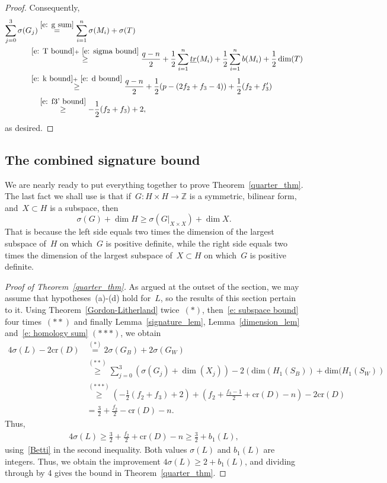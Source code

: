 \documentclass[10pt,a4paper]{amsart}
\numberwithin{equation}{section}
\newcommand{\rcr}{\mathrm{cr}}
\newcommand{\rdim}{\mathrm{dim}}
\newcommand{\bbZ}{\mathbb{Z}}
\begin{document}
\begin{proof}
Consequently,
\begin{align*}
\sum_{j=0}^3 \sigma(G_j) &\overset{\eqref{e: g sum}}{=} \sum_{i=1}^n \sigma(M_i) + \sigma(T) \\
&\mkern-20mu\overset{\eqref{e: T bound} +~\eqref{e: sigma bound}}{\ge} \frac{q-n}{2} +
\frac12 \sum_{i=1}^n \underline{tr}(M_i) + \frac12 \sum_{i=1}^n b(M_i) + \frac12 \dim(T) \\
&\mkern-20mu\overset{\eqref{e: k bound} +~\eqref{e: d bound}}{\ge} \frac{q-n}{2} +
\frac12 (p - (2f_2 + f_3 - 4))+ \frac12 (f_2+f_3') \\
&\overset{\eqref{e: f3' bound}}{\ge} - \frac12 (f_2 +f_3) +2,
\end{align*}
as desired.
\end{proof}

\subsection{The combined signature bound}

We are nearly ready to put everything together to prove Theorem~\ref{quarter_thm}. The last fact we shall use is that if~$G : H \times H \to \bbZ$ is a symmetric, bilinear form, and~$X \subset H$ is a subspace, then
\begin{equation}\label{e: subspace bound}
\sigma(G) + \dim H \ge \sigma(G |_{X \times X}) + \dim X.
\end{equation}
That is because the left side equals two times the dimension of the largest subspace of~$H$ on which~$G$ is positive definite, while the right side equals two times the dimension of the largest subspace of~$X \subset H$ on which~$G$ is positive definite.


\begin{proof}[Proof of Theorem~\ref{quarter_thm}]
As argued at the outset of the section, we may assume that hypotheses~(a)-(d) hold for~$L$, so the results of this section pertain to it. Using {Theorem}~\ref{Gordon-Litherland} twice~$(\ast)$, then~\eqref{e: subspace bound} four times~$(\ast\ast)$ and finally Lemma~\ref{signature_lem}, Lemma~\ref{dimension_lem} and~\eqref{e: homology sum} $(\ast\ast\ast)$, we obtain
\begin{align*}
4\sigma(L) - 2\rcr (D) &\overset{(\ast)}= 2\sigma(G_B) + 2\sigma(G_W) \\
&\overset{(\ast\ast)}\ge \sum_{j=0}^3 \left(\sigma(G_j) + \dim(X_j)\right) - 2 \left(\rdim (H_1(S_B)) + \rdim (H_1(S_W)\right)\\
&\overset{(\ast\ast\ast)}\ge \left(-\frac{1}{2}(f_2 + f_3) + 2 \right) + \left(f_2 + \frac{f_3-1}{2} +
\rcr (D) - n \right) - 2 \rcr (D) \\
&= \frac{3}{2} + \frac{f_2}{2} -\rcr (D)-n.
\end{align*}
Thus,
\begin{align}\label{final_eq}
4\sigma(L) \ge \frac{3}{2} + \frac{f_2}{2} + \rcr (D)-n \ge \frac{3}{2} + b_1(L),
\end{align}
using~\eqref{Betti} in the second inequality. Both values $\sigma(L)$ and $b_1(L)$ are integers. Thus, we obtain the improvement $4 \sigma(L) \ge 2 + b_1(L)$, and dividing through by 4 gives the bound in Theorem~\ref{quarter_thm}.
\end{proof}
\end{document}
